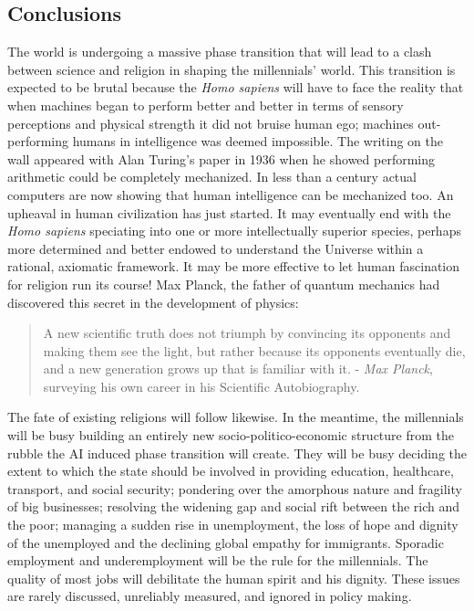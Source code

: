 \begin{multicols}{2}
\section{Conclusions}

The world is undergoing a massive phase transition that will lead to a clash between science and religion in shaping the millennials’ world. This transition is expected to be brutal because the \textit{Homo sapiens} will have to face the reality that when machines began to perform better and better in terms of sensory perceptions and physical strength it did not bruise human ego; machines out-performing humans in intelligence was deemed impossible. The writing on the wall appeared with Alan Turing's paper in 1936 when he showed performing arithmetic could be completely mechanized. In less than a century actual computers are now showing that human intelligence can be mechanized too. An upheaval in human civilization has just started. It may eventually end with the \textit{Homo sapiens} speciating into one or more intellectually superior species, perhaps more determined and better endowed to understand the Universe within a rational, axiomatic framework. It may be more effective to let human fascination for religion run its course! Max Planck, the father of quantum mechanics had discovered this secret in the development of physics:

\begin{quote}
A new scientific truth does not triumph by convincing its opponents and making them see the light, but rather because its opponents eventually die, and a new generation grows up that is familiar with it. - \textit{Max Planck}, surveying his own career in his Scientific Autobiography. 
\end{quote}

The fate of existing religions will follow likewise. In the meantime, the millennials will be busy building an entirely new socio-politico-economic structure from the rubble the AI induced phase transition will create. They will be busy deciding the extent to which the state should be involved in providing education, healthcare, transport, and social security; pondering over the amorphous nature and fragility of big businesses; resolving the widening gap and social rift between the rich and the poor; managing a sudden rise in unemployment, the loss of hope and dignity of the unemployed and the declining global empathy for immigrants. Sporadic employment and underemployment will be the rule for the millennials. The quality of most jobs will debilitate the human spirit and his dignity. These issues are rarely discussed, unreliably measured, and ignored in policy making.



\end{multicols}
